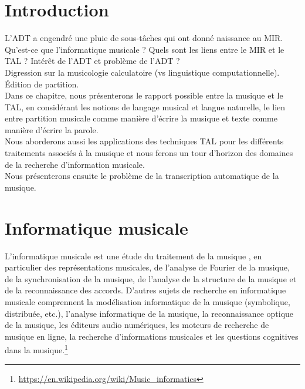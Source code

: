\section*{Introduction}
L’ADT a engendré une pluie de sous-tâches qui ont donné naissance au MIR.
Qu’est-ce que l’informatique musicale ?
Quels sont les liens entre le MIR et le TAL ?
Intérêt de l’ADT et problème de l’ADT ?\\
Digression sur la musicologie calculatoire (vs linguistique computationnelle).\\
Édition de partition.\\
 
Dans ce chapitre, nous présenterons le rapport possible entre la musique et le TAL, en considérant les notions de langage musical et langue naturelle, le lien entre partition musicale comme manière d’écrire la musique et texte comme manière d’écrire la parole.\\
Nous aborderons aussi les applications des techniques TAL pour les différents traitements associés à la musique et nous ferons un tour d’horizon des domaines de la recherche d’information musicale.\\ Nous présenterons ensuite le problème de la transcription automatique de la musique.

\section{Informatique musicale}
L'informatique musicale est une étude du traitement de la musique \cite{book_muller}, en particulier des représentations musicales, de l'analyse de Fourier de la musique, de la synchronisation de la musique, de l'analyse de la structure de la musique et de la reconnaissance des accords. D'autres sujets de recherche en informatique musicale comprennent la modélisation informatique de la musique (symbolique, distribuée, etc.), l'analyse informatique de la musique, la reconnaissance optique de la musique, les éditeurs audio numériques, les moteurs de recherche de musique en ligne, la recherche d'informations musicales et les questions cognitives dans la musique.\footnote{\url{https://en.wikipedia.org/wiki/Music_informatics}}

